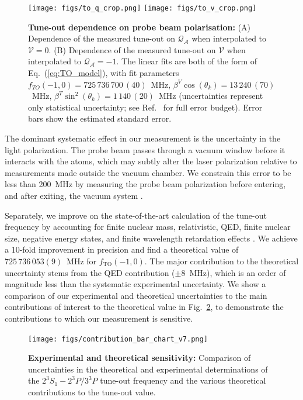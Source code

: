 \documentclass[aps,prl,
reprint,
superscriptaddress,
 amsmath,amssymb,
floatfix
]{revtex4-2}
\newcommand{\MetastableState}{2^{3\!}S_1}%
\newcommand{\UpperStateManifold}{3^{3\!}P}%
\newcommand{\LowerStateManifold}{2^{3\!}P}%
\newcommand{\TO}{\MetastableState- \LowerStateManifold / \UpperStateManifold}%
\begin{document}
\begin{figure}
\centering
\texttt{[image: figs/to\_q\_crop.png]}
\texttt{[image: figs/to\_v\_crop.png]}
\caption{\textbf{Tune-out dependence on probe beam polarisation:}
(A) Dependence of the measured tune-out on $\mathcal{Q_{A}}$ when interpolated to $\mathcal{V}=0$. (B) Dependence of the measured tune-out on $\mathcal{V}$ when interpolated to $\mathcal{Q_{A}}=-1$. The linear fits are both of the form of Eq.~(\ref{eq:TO_model}), with fit parameters \(f_{TO}(-1,0)=725\,736\,700\,(40)\)~MHz, \(\beta^V \cos(\theta_k)=13\,240\,(70)\)~MHz, \(\beta^T \sin^2(\theta_k)=1\,140\,(20)\)~MHz (uncertainties represent only statistical uncertainty; see Ref.~\cite{SOMs} for full error budget). Error bars show the estimated standard error.
} 
\label{fig:pol_TO} 
\end{figure}


The dominant systematic effect in our measurement is the uncertainty in the light polarization. The probe beam passes through a vacuum window before it interacts with the atoms, which may subtly alter the laser polarization relative to measurements made outside the vacuum chamber.
We constrain this error to be less than 200~MHz by measuring the probe beam polarization before entering, and after exiting, the vacuum system \cite{SOMs}. 


Separately, we improve on the state-of-the-art calculation \cite{PhysRevA.99.040502} of the tune-out frequency by accounting for finite nuclear mass, relativistic, QED, finite nuclear size, negative energy states, and finite wavelength retardation effects \cite{Drake2019, PhysRevA.99.041803,SOMs}. 
We achieve a 10-fold improvement in precision and find a theoretical value of \(725\,736\,053(9)\)~MHz for \(f_{\mathrm{TO}}(-1,0)\). The major contribution to the theoretical uncertainty stems from the QED contribution (\(\pm 8\)~MHz), which is an order of magnitude less than the systematic experimental uncertainty.
We show a comparison of our experimental and theoretical uncertainties to the main contributions of interest to the theoretical value in Fig.~\ref{fig:contributions}, to demonstrate the contributions to which our measurement is sensitive.


\begin{figure}[t]
    \centering
    \texttt{[image: figs/contribution\_bar\_chart\_v7.png]}
    \caption{\textbf{Experimental and theoretical sensitivity:} Comparison of uncertainties in the theoretical and experimental determinations of the \(\TO\) tune-out frequency and the various theoretical contributions to the tune-out value.}
    \label{fig:contributions}
\end{figure}
\end{document}
